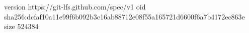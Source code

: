 version https://git-lfs.github.com/spec/v1
oid sha256:dcfaf10a11e99f6b092b3c16ab88712e08f55a165721d6600f6a7b4172ec863e
size 524384
